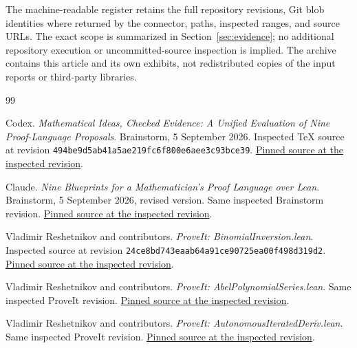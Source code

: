 \documentclass[11pt,letterpaper]{article}
\newcommand{\code}[1]{\nolinkurl{#1}}
\theoremstyle{definition}
\begin{document}
The machine-readable register retains the full repository revisions, Git blob
identities where returned by the connector, paths, inspected ranges, and source
URLs. The exact scope is summarized in Section~\ref{sec:evidence}; no additional
repository execution or uncommitted-source inspection is implied. The archive
contains this article and its own exhibits, not redistributed copies of the input
reports or third-party libraries.


\clearpage
{}
{}
\begin{thebibliography}{99}
\small\raggedright\setlength{\parskip}{0pt}\setlength{\itemsep}{.5em}
Codex. \emph{Mathematical Ideas, Checked Evidence: A Unified Evaluation of Nine
Proof-Language Proposals}. Brainstorm, 5 September 2026. Inspected TeX source at
revision \code{494be9d5ab41a5ae219fc6f800e6aee3c93bce39}.
\href{https://github.com/VladimirReshetnikov/Brainstorm/blob/494be9d5ab41a5ae219fc6f800e6aee3c93bce39/docs/synthesis/unified-report.tex}{Pinned source at the inspected revision}.

Claude. \emph{Nine Blueprints for a Mathematician's Proof Language over Lean}.
Brainstorm, 5 September 2026, revised version. Same inspected Brainstorm revision.
\href{https://github.com/VladimirReshetnikov/Brainstorm/blob/494be9d5ab41a5ae219fc6f800e6aee3c93bce39/docs/unified_report/unified_report.tex}{Pinned source at the inspected revision}.

Vladimir Reshetnikov and contributors. \emph{ProveIt: BinomialInversion.lean}.
Inspected source at revision \code{24ce8bd743eaab64a91ce90725ea00f498d319d2}.
\href{https://github.com/VladimirReshetnikov/ProveIt/blob/24ce8bd743eaab64a91ce90725ea00f498d319d2/Analysis/FabiusFunction/Lean/FabiusFunction/BinomialInversion.lean}{Pinned source at the inspected revision}.

Vladimir Reshetnikov and contributors. \emph{ProveIt: AbelPolynomialSeries.lean}.
Same inspected ProveIt revision.
\href{https://github.com/VladimirReshetnikov/ProveIt/blob/24ce8bd743eaab64a91ce90725ea00f498d319d2/Analysis/FabiusFunction/Lean/FabiusFunction/AbelPolynomialSeries.lean}{Pinned source at the inspected revision}.

Vladimir Reshetnikov and contributors. \emph{ProveIt: AutonomousIteratedDeriv.lean}.
Same inspected ProveIt revision.
\href{https://github.com/VladimirReshetnikov/ProveIt/blob/24ce8bd743eaab64a91ce90725ea00f498d319d2/Analysis/FabiusFunction/Lean/FabiusFunction/AutonomousIteratedDeriv.lean}{Pinned source at the inspected revision}.


\end{thebibliography}
\end{document}
